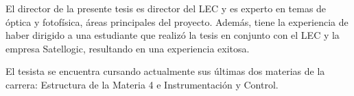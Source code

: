 \documentclass{ctuthesis}
\begin{document}
El director de la presente tesis es director del LEC y es experto en temas de 
óptica y fotofísica, áreas principales del proyecto. Además, tiene la 
experiencia de haber dirigido a una estudiante que realizó la tesis en conjunto 
con el LEC y la empresa Satellogic, resultando en una experiencia exitosa.

El tesista se encuentra cursando actualmente sus últimas dos materias de la 
carrera: 
Estructura de la Materia 4 e Instrumentación y Control.


\renewcommand\bibname{Referencias Bibliográficas}


\end{document}
